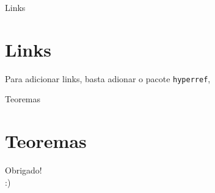 \documentclass[12pt]{beamer}
\begin{document}
\begin{frame}[fragile]{Links}
  \section{Links}
  Para adicionar links, basta adionar o pacote \verb+hyperref+,
\end{frame}

\begin{frame}{Teoremas}
  \section{Teoremas}
\end{frame}

\begin{frame}
  \begin{center}
    \large Obrigado!\\
    :)
  \end{center}
\end{frame}
\end{document}
